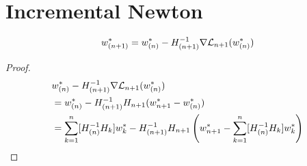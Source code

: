 \section{Incremental Newton}

\begin{theorem}
	\begin{align*}
		w^*_{(n+1)}
		= w^*_{(n)} - H_{(n+1)}^{-1}\nabla\mathcal{L}_{n+1}(w^*_{(n)})
	\end{align*}
\end{theorem}
\begin{proof}
	\begin{align*}
		&w^*_{(n)} - H_{(n+1)}^{-1}\nabla\mathcal{L}_{n+1}(w^*_{(n)})\\
		&= w^*_{(n)} - H_{(n+1)}^{-1}H_{n+1}(w^*_{n+1} - w^*_{(n)})\\
		&= \sum_{k=1}^n [H_{(n)}^{-1} H_k] w^*_{k} - H_{(n+1)}^{-1}H_{n+1}
		\left(w^*_{n+1} - \sum_{k=1}^n [H_{(n)}^{-1} H_k] w^*_{k}\right)
	\end{align*}
\end{proof}